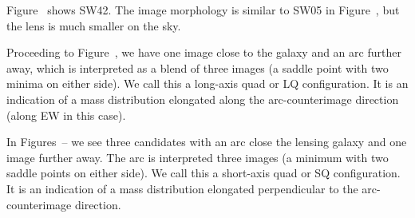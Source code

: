 Figure~ shows SW42.  The image morphology is similar to
SW05 in Figure~, but the lens is much smaller on the sky.

Proceeding to Figure~, we have one image close to the
galaxy and an arc further away, which is interpreted as a blend of
three images (a saddle point with two minima on either side).  We call
this a long-axis quad or LQ configuration.  It is an indication of a
mass distribution elongated along the arc-counterimage direction
(along EW in this case).

In Figures~-- we see three candidates with
an arc close the lensing galaxy and one image further away.  The arc
is interpreted three images (a minimum with two saddle points on
either side).  We call this a short-axis quad or SQ configuration.  It
is an indication of a mass distribution elongated perpendicular to the
arc-counterimage direction.

